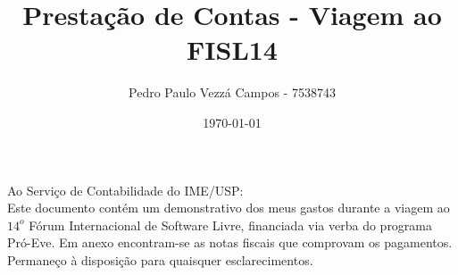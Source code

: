 \documentclass{article}
\begin{document}
\title{Prestação de Contas - Viagem ao FISL14}
\author{Pedro Paulo Vezzá Campos - 7538743}
\date{\today}

\maketitle


\hfill Ao Serviço de Contabilidade do IME/USP:\\

Este documento contém um demonstrativo dos meus gastos durante a viagem ao $14^o$ Fórum Internacional de Software Livre, financiada via verba do programa Pró-Eve. Em anexo encontram-se as notas fiscais que comprovam os pagamentos. Permaneço à disposição para quaisquer esclarecimentos.
\end{document}
